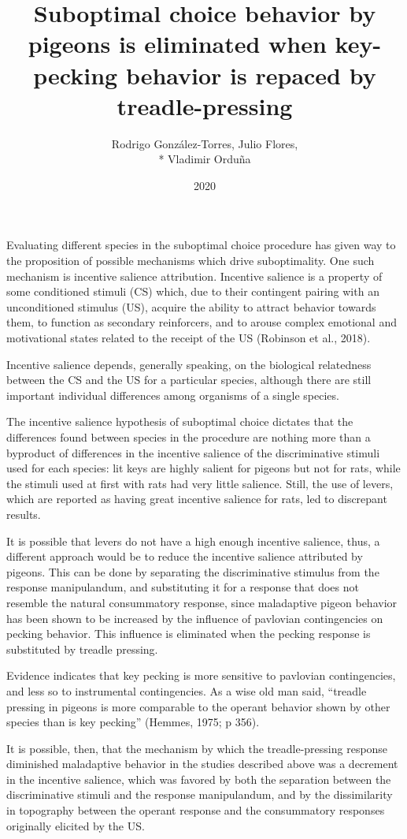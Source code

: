 \documentclass[a4paper,12pt]{article}
\title{Suboptimal choice behavior by pigeons is eliminated when key-pecking behavior is repaced by treadle-pressing}
\author{Rodrigo González-Torres, Julio Flores,\\* Vladimir Orduña}
\date{2020}
\begin{document}
{\scshape\bfseries \maketitle}

Evaluating different species in the suboptimal choice procedure has given way to the proposition of possible mechanisms which drive suboptimality. One such mechanism is incentive salience attribution. Incentive salience is a property of some conditioned stimuli (CS) which, due to their contingent pairing with an unconditioned stimulus (US), acquire the ability to attract behavior towards them, to function as secondary reinforcers, and to arouse complex emotional and motivational states related to the receipt of the US (Robinson et al., 2018).

Incentive salience depends, generally speaking, on the biological relatedness between the CS and the US for a particular species, although there are still important individual differences among organisms of a single species.

The incentive salience hypothesis of suboptimal choice dictates that the differences found between species in the procedure are nothing more than a byproduct of differences in the incentive salience of the discriminative stimuli used for each species: lit keys are highly salient for pigeons but not for rats, while the stimuli used at first with rats had very little salience. Still, the use of levers, which are reported as having great incentive salience for rats, led to discrepant results.

It is possible that levers do not have a high enough incentive salience, thus, a different approach would be to reduce the incentive salience attributed by pigeons. This can be done by separating the discriminative stimulus from the response manipulandum, and substituting it for a response that does not resemble the natural consummatory response, since maladaptive pigeon behavior has been shown to be increased by the influence of pavlovian contingencies on pecking behavior. This influence is eliminated when the pecking response is substituted by treadle pressing.

Evidence indicates that key pecking is more sensitive to pavlovian contingencies, and less so to instrumental contingencies. As a wise old man said, “treadle pressing in pigeons is more comparable to the operant behavior shown by other species than is key pecking” (Hemmes, 1975; p 356).

It is possible, then, that the mechanism by which the treadle-pressing response diminished maladaptive behavior in the studies described above was a decrement in the incentive salience, which was favored by both the separation between the discriminative stimuli and the response manipulandum, and by the dissimilarity in topography between the operant response and the consummatory responses originally elicited by the US.
\end{document}
